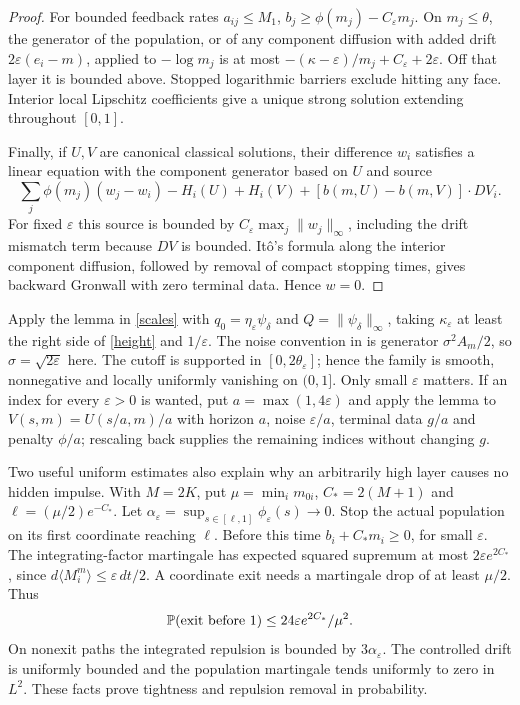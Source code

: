 \documentclass[11pt,a4paper]{article}
\newcommand{\PP}{\mathbb P}
\newcommand{\dt}{\,dt}
\begin{document}
\begin{proof}
For bounded feedback rates $a_{ij}\leq M_1$,
$b_j\geq\phi(m_j)-C_\varepsilon m_j$.
On $m_j\leq\theta$, the generator of the population, or of any
component diffusion with added drift $2\varepsilon(e_i-m)$, applied
to $-\log m_j$ is at most
$-(\kappa-\varepsilon)/m_j+C_\varepsilon+2\varepsilon$.
Off that layer it is bounded above. Stopped logarithmic barriers
exclude hitting any face. Interior local Lipschitz coefficients give
a unique strong solution extending throughout $[0,1]$.

Finally, if $U,V$ are canonical classical solutions, their difference
$w_i$ satisfies a linear equation with the component generator based
on $U$ and source
\[
 \sum_j\phi(m_j)(w_j-w_i)-H_i(U)+H_i(V)
                  +[b(m,U)-b(m,V)]\cdot DV_i.
\]
For fixed $\varepsilon$ this source is bounded by
$C_\varepsilon\max_j\|w_j\|_\infty$, including the drift mismatch
term because $DV$ is bounded. It\^o's formula along the interior
component diffusion, followed by removal of compact stopping times,
gives backward Gronwall with zero terminal data. Hence $w=0$.
\end{proof}

Apply the lemma in \eqref{scales} with
$q_0=\eta_\varepsilon\psi_\delta$ and
$Q=\|\psi_\delta\|_\infty$, taking $\kappa_\varepsilon$ at least
the right side of \eqref{height} and $1/\varepsilon$.
The noise convention in \cite{BCCD} is generator
$\sigma^2 A_m/2$, so $\sigma=\sqrt{2\varepsilon}$ here.
The cutoff is supported in $[0,2\theta_\varepsilon]$; hence the family
is smooth, nonnegative and locally uniformly vanishing on $(0,1]$.
Only small $\varepsilon$ matters. If an index for every
$\varepsilon>0$ is wanted, put $a=\max(1,4\varepsilon)$ and apply
the lemma to $V(s,m)=U(s/a,m)/a$ with horizon $a$, noise
$\varepsilon/a$, terminal data $g/a$ and penalty $\phi/a$;
rescaling back supplies the remaining indices without changing $g$.

Two useful uniform estimates also explain why an arbitrarily high
layer causes no hidden impulse. With $M=2K$, put
$\mu=\min_i m_{0i}$, $C_*=2(M+1)$ and
$\ell=(\mu/2)e^{-C_*}$. Let
$\alpha_\varepsilon=\sup_{s\in[\ell,1]}\phi_\varepsilon(s)\to0$.
Stop the actual population on its first coordinate reaching $\ell$.
Before this time $b_i+C_*m_i\geq0$, for small $\varepsilon$.
The integrating-factor martingale has expected squared supremum
at most $2\varepsilon e^{2C_*}$, since
$d\langle M_i^m\rangle\leq\varepsilon\dt/2$.
A coordinate exit needs a martingale drop of at least $\mu/2$.
Thus
\begin{equation}\label{globalexit}
 \PP(\hbox{exit before }1)\leq24\varepsilon e^{2C_*}/\mu^2.
\end{equation}
On nonexit paths the integrated repulsion is bounded by
$3\alpha_\varepsilon$. The controlled drift is uniformly bounded
and the population martingale tends uniformly to zero in $L^2$.
These facts prove tightness and repulsion removal in probability.
\end{document}
